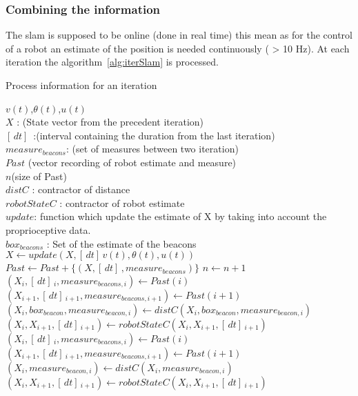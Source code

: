 \subsubsection*{Combining the information}

The slam is supposed to be online (done in real time) this mean as for the control of a robot an estimate of
the position is needed continuously ( > 10 Hz). At each iteration the algorithm~\ref{alg:iterSlam} is processed.

\begin{algorithm}[H]
\caption{Process information for an iteration }
\label{alg:iterSlam}
\begin{algorithmic}[1]
\REQUIRE $v(t)$,$\theta(t)$,$u(t)$\\
   $X$ : (State vector from the precedent iteration)\\
   $[\,dt]\,$ :(interval containing the duration from the last iteration)\\
   $measure_{beacons}$: (set of measures between two iteration)\\
   $Past$ (vector recording of robot estimate and measure)\\
   $n$(size of Past)\\
   $distC$ : contractor of distance\\
   $robotStateC$ : contractor of robot estimate\\
   $update$: function which update the estimate of X by taking into account the proprioceptive data.\\
   $box_{beacons}$ : Set of the estimate of the beacons  
\STATE $X \leftarrow update(X,[\,dt]\,v(t),\theta(t),u(t)) $
\STATE $Past  \leftarrow Past + \{(X,[\,dt]\,,measure_{beacons})\} $
\STATE $n  \leftarrow n+1 $
\STATE $(X_{i},[\,dt]\,_{i},measure_{beacons,i}) \leftarrow Past(i)$
\STATE $(X_{i+1},[\,dt]\,_{i+1},measure_{beacons,i+1}) \leftarrow Past(i+1)$
\label{op:distB_1}
\STATE $(X_{i},box_{beacon},measure_{beacon,i}) \leftarrow distC(X_{i},box_{beacon},measure_{beacon,i})$
\ENDFOR
\STATE $(X_{i},X_{i+1},[\,dt]\,_{i+1}) \leftarrow robotStateC(X_{i},X_{i+1},[\,dt]\,_{i+1})$
\ENDFOR
{}
\STATE $(X_{i},[\,dt]\,_{i},measure_{beacons,i}) \leftarrow Past(i)$
\STATE $(X_{i+1},[\,dt]\,_{i+1},measure_{beacons,i+1}) \leftarrow Past(i+1)$
\label{op:distB_2}
\STATE $(X_{i},measure_{beacon,i}) \leftarrow distC(X_{i},measure_{beacon,i})$
\ENDFOR
\STATE $(X_{i},X_{i+1},[\,dt]\,_{i+1}) \leftarrow robotStateC(X_{i},X_{i+1},[\,dt]\,_{i+1})$
\ENDFOR
\ENDIF
\end{algorithmic}
\end{algorithm}

